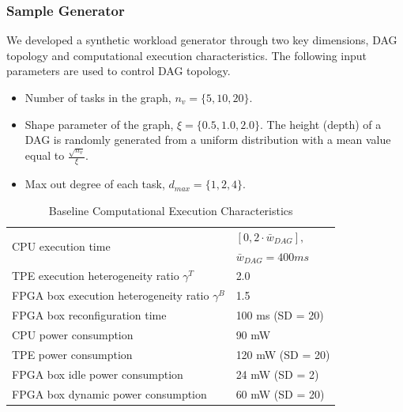 \documentclass{IEEEtaes}
\begin{document}
\subsubsection{Sample Generator}
We developed a synthetic workload generator through two key dimensions, DAG topology and computational execution characteristics. 
The following input parameters are used to control DAG topology.
\begin{itemize}
    \item{Number of tasks in the graph, $n_v=\{5,10,20\}$.}
    \item{Shape parameter of the graph, $\xi=\{0.5,1.0, 2.0\}$. The height (depth) of a DAG is randomly generated from a uniform distribution with a mean value equal  to $\frac{\sqrt{n_v}}{\xi}$.}
    \item{Max out degree of each task, $d_{max}=\{1,2,4\}$.}
\end{itemize}

\begin{table}[!t]
\caption{Baseline Computational Execution Characteristics}
\begin{center}
\begin{tabular}{l l}
\hline
\multirow{2}{*}{CPU execution time}& $[0,2\cdot \bar{w}_{DAG}],$\\
&$\bar{w}_{DAG}=400ms$\\
\hline
TPE execution heterogeneity ratio $\gamma^T$& 2.0\\
\hline
FPGA box execution heterogeneity ratio $\gamma^B$& 1.5\\
\hline
FPGA box reconfiguration time& 100 ms (SD = 20)\\
\hline
CPU power consumption& 90 mW\\
\hline
TPE power consumption& 120 mW (SD = 20)\\
\hline
FPGA box idle power consumption& 24 mW (SD = 2)\\
\hline
FPGA box dynamic power consumption& 60 mW (SD = 20)\\
\hline
\end{tabular}
\label{tab1}
\end{center}
\end{table}
\end{document}
